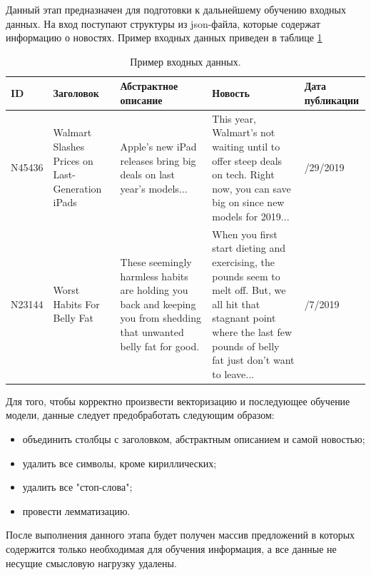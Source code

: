 Данный этап предназначен для подготовки к дальнейшему обучению входных данных. На вход поступают структуры из json-файла, которые содержат информацию о новостях. Пример входных данных приведен в таблице \ref{input_data}

\begin{table}[H]
	\caption{Пример входных данных.}
	\label{input_data}
	\begin{center}
		\begin{tabularx}{1\textwidth}{ 
				| >{\centering\arraybackslash}X 
				| >{\centering\arraybackslash}X 
				| >{\centering\arraybackslash}X
				| >{\centering\arraybackslash}X 
				| >{\centering\arraybackslash}X | }
			\hline
			ID & Заголовок & Абстрактное описание & Новость & Дата публикации \\ 
			\hline
			N45436 & Walmart Slashes Prices on Last-Generation iPads & Apple's new iPad releases bring big deals on last year's models... &  This year, Walmart’s not waiting until to offer steep deals on tech. Right now, you can save big on since new models for 2019... & 10/29/2019 \\ 
			\hline
			N23144	& 50 Worst Habits For Belly Fat & These seemingly harmless habits are holding you back and keeping you from shedding that unwanted belly fat for good. & When you first start dieting and exercising, the pounds seem to melt off. But, we all hit that stagnant point where the last few pounds of belly fat just don’t want to leave... & 5/7/2019 \\ 
			\hline
		\end{tabularx}
	\end{center}
\end{table}

Для того, чтобы корректно произвести векторизацию и последующее обучение модели, данные следует предобработать следующим образом:

\begin{itemize}
	\item объединить столбцы с заголовком, абстрактным описанием и самой новостью;
	\item удалить все символы, кроме кириллических;
	\item удалить все "стоп-слова";
	\item провести лемматизацию.
\end{itemize}

После выполнения данного этапа будет получен массив предложений в которых содержится только необходимая для обучения информация, а все данные не несущие смысловую нагрузку удалены.

